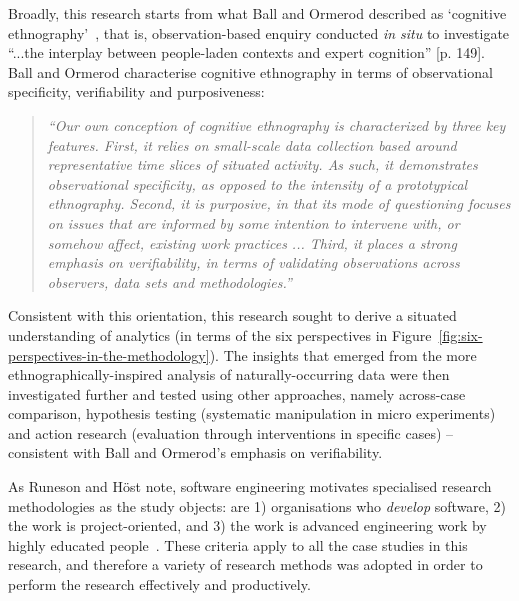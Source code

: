 Broadly, this research starts from what Ball and Ormerod described as `cognitive ethnography'~, that is, observation-based enquiry conducted \textit{in situ} to investigate ``...the interplay between people-laden contexts and expert cognition'' [p. 149]. Ball and Ormerod characterise cognitive ethnography in terms of observational specificity, verifiability and purposiveness: 

\begin{quote}
  \textit{``Our own conception of cognitive ethnography is characterized by three key features. First, it relies on small-scale data collection based around representative time slices of situated activity. As such, it demonstrates observational specificity, as opposed to the intensity of a prototypical ethnography. Second, it is purposive, in that its mode of questioning focuses on issues that are informed by some intention to intervene with, or somehow affect, existing work practices ... Third, it places a strong emphasis on verifiability, in terms of validating observations across observers, data sets and methodologies.''}   ~ 
\end{quote} %

Consistent with this orientation, this research sought to derive a situated understanding of analytics (in terms of the six perspectives in Figure~\ref{fig:six-perspectives-in-the-methodology}). The insights that emerged from the more ethnographically-inspired analysis of naturally-occurring data were then investigated further and tested using other approaches, namely across-case comparison, hypothesis testing (systematic manipulation in micro experiments) and action research (evaluation through interventions in specific cases) -- consistent with Ball and Ormerod's emphasis on verifiability.

As Runeson and Höst note, software engineering motivates specialised research methodologies as the study objects: are 1) organisations who \emph{develop} software, 2) the work is project-oriented, and 3) the work is advanced engineering work by highly educated people~. %
These criteria apply to all the case studies in this research, and therefore a variety of research methods was adopted in order to perform the research effectively and productively. 

